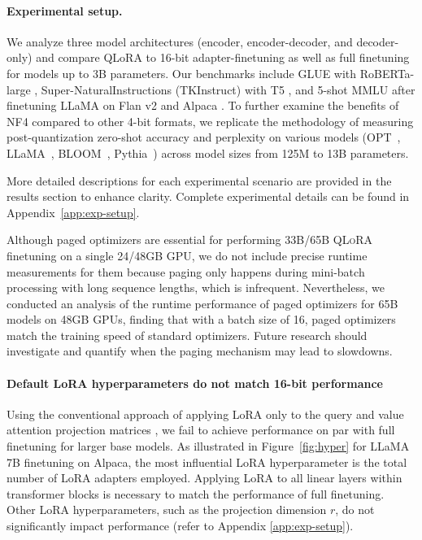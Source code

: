 \paragraph{Experimental setup.} We analyze three model architectures (encoder, encoder-decoder, and decoder-only) and compare QLoRA to 16-bit adapter-finetuning as well as full finetuning for models up to 3B parameters. Our benchmarks include GLUE \citep{wang2018glue} with RoBERTa-large \citep{liu2019roberta}, Super-NaturalInstructions (TKInstruct) \citep{wang2022super} with T5 \citep{t5}, and 5-shot MMLU \citep{hendrycksmeasuring} after finetuning LLaMA on Flan v2 \citep{longpre2023flan} and Alpaca \citep{alpaca}. To further examine the benefits of NF4 compared to other 4-bit formats, we replicate the methodology of \citet{dettmers2022case} measuring post-quantization zero-shot accuracy and perplexity on various models (OPT~\citep{zhang2022opt}, LLaMA~\citep{touvron2023llama}, BLOOM~\citep{scao2022bloom}, Pythia~\citep{biderman2023pythia}) across model sizes from 125M to 13B parameters.

More detailed descriptions for each experimental scenario are provided in the results section to enhance clarity. Complete experimental details can be found in Appendix~\ref{app:exp-setup}.

Although paged optimizers are essential for performing 33B/65B \textsc{QLoRA} finetuning on a single 24/48GB GPU, we do not include precise runtime measurements for them because paging only happens during mini-batch processing with long sequence lengths, which is infrequent. Nevertheless, we conducted an analysis of the runtime performance of paged optimizers for 65B models on 48GB GPUs, finding that with a batch size of 16, paged optimizers match the training speed of standard optimizers. Future research should investigate and quantify when the paging mechanism may lead to slowdowns.

\paragraph{Default LoRA hyperparameters do not match 16-bit performance}

Using the conventional approach of applying LoRA only to the query and value attention projection matrices \citep{hu2021lora}, we fail to achieve performance on par with full finetuning for larger base models. As illustrated in Figure~\ref{fig:hyper} for LLaMA 7B finetuning on Alpaca, the most influential LoRA hyperparameter is the total number of LoRA adapters employed. Applying LoRA to all linear layers within transformer blocks is necessary to match the performance of full finetuning. Other LoRA hyperparameters, such as the projection dimension $r$, do not significantly impact performance (refer to Appendix \ref{app:exp-setup}).

